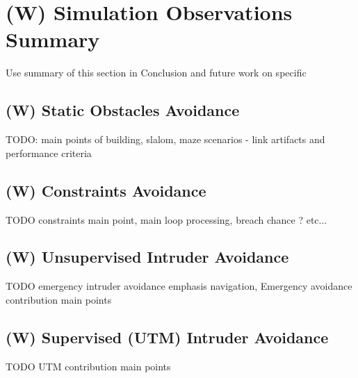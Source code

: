 \section{(W) Simulation Observations Summary}\label{sec:SimulationObservationsSummary}
    \noindent Use summary of this section in Conclusion and future work on specific 

\subsection{(W) Static Obstacles Avoidance}\label{sec:staticObstacleAvoidanceSummary}
    \noindent TODO: main points of building, slalom, maze scenarios - link artifacts and performance criteria

\subsection{(W) Constraints Avoidance}\label{sec:constraintAvoidanceSummary}
    \noindent TODO constraints main point, main loop processing, breach chance ? etc...
    
\subsection{(W) Unsupervised Intruder Avoidance}\label{sec:unsupervisedIntruderAvoidance}
    \noindent TODO emergency intruder avoidance emphasis navigation, Emergency avoidance contribution main points

\subsection{(W) Supervised (UTM) Intruder Avoidance}\label{sec:supervisedIntruderAvoidance}
    \noindent TODO UTM contribution main points
    
